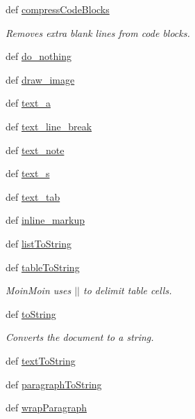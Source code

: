 \begin{DoxyCompactItemize}
def \hyperlink{classodf_1_1odf2moinmoin_1_1ODF2MoinMoin_a550431fb2b654a4a25856cd05135fe3f}{compress\+Code\+Blocks}
\begin{DoxyCompactList}\small\item\em Removes extra blank lines from code blocks. \end{DoxyCompactList}\item 
def \hyperlink{classodf_1_1odf2moinmoin_1_1ODF2MoinMoin_ab1ada6db6b053e302f32f96d35d77a10}{do\+\_\+nothing}
\item 
def \hyperlink{classodf_1_1odf2moinmoin_1_1ODF2MoinMoin_a2208cf68f88266549eea8066e7df3a4d}{draw\+\_\+image}
\item 
def \hyperlink{classodf_1_1odf2moinmoin_1_1ODF2MoinMoin_ae8d1354370b6a766b4a4a13e641c3f3e}{text\+\_\+a}
\item 
def \hyperlink{classodf_1_1odf2moinmoin_1_1ODF2MoinMoin_ae232ee2d660a48518bdc62b38290df41}{text\+\_\+line\+\_\+break}
\item 
def \hyperlink{classodf_1_1odf2moinmoin_1_1ODF2MoinMoin_a3b0b8148243f876b62fbe69ed9118674}{text\+\_\+note}
\item 
def \hyperlink{classodf_1_1odf2moinmoin_1_1ODF2MoinMoin_a09c4fa6d9d63b9ea2da9f9c8a7208da3}{text\+\_\+s}
\item 
def \hyperlink{classodf_1_1odf2moinmoin_1_1ODF2MoinMoin_a53979087bb2ffdb9821492c8dfa60765}{text\+\_\+tab}
\item 
def \hyperlink{classodf_1_1odf2moinmoin_1_1ODF2MoinMoin_a6c254d8936107bf3d5fdb6f8987c146c}{inline\+\_\+markup}
\item 
def \hyperlink{classodf_1_1odf2moinmoin_1_1ODF2MoinMoin_ac0ae168e52e4a0bb3f66bd2de1852556}{list\+To\+String}
\item 
def \hyperlink{classodf_1_1odf2moinmoin_1_1ODF2MoinMoin_a8ff7e610a43ebc6e0d42401dbdb5ba8a}{table\+To\+String}
\begin{DoxyCompactList}\small\item\em Moin\+Moin uses $\vert$$\vert$ to delimit table cells. \end{DoxyCompactList}\item 
def \hyperlink{classodf_1_1odf2moinmoin_1_1ODF2MoinMoin_ad3d4dfeb7a6fefddddc811d6d4a49cb2}{to\+String}
\begin{DoxyCompactList}\small\item\em Converts the document to a string. \end{DoxyCompactList}\item 
def \hyperlink{classodf_1_1odf2moinmoin_1_1ODF2MoinMoin_a3b934831961c582a520bc50747197f79}{text\+To\+String}
\item 
def \hyperlink{classodf_1_1odf2moinmoin_1_1ODF2MoinMoin_a952b697c0cd2a9a87c43be10ae6c6cdb}{paragraph\+To\+String}
\item 
def \hyperlink{classodf_1_1odf2moinmoin_1_1ODF2MoinMoin_aa96275d7d25d2c1f8e085a0fd43c4b08}{wrap\+Paragraph}
\end{DoxyCompactItemize}
